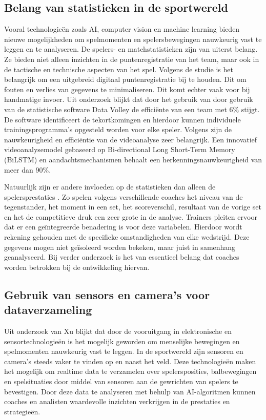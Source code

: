 \subsection{Belang van statistieken in de sportwereld}
Vooral technologieën zoals AI, computer vision en machine learning bieden nieuwe mogelijkheden om spelmomenten en spelersbewegingen nauwkeurig vast te leggen en te analyseren. De spelers- en matchstatistieken \autocite{Wahyuti2023} zijn van uiterst belang. Ze bieden niet alleen inzichten in de puntenregistratie van het team, maar ook in de tactische en technische aspecten van het spel. Volgens de studie is het belangrijk om een uitgebreid digitaal puntenregistratie bij te houden. Dit om fouten en verlies van gegevens te minimaliseren. Dit komt echter vaak voor bij handmatige invoer. Uit onderzoek \autocite{Harabagiu2023} blijkt dat door het gebruik van door gebruik van de statistische software Data Volley de efficiënte van een team met 6\% stijgt. De software identificeert de tekortkomingen en hierdoor kunnen individuele trainingsprogramma's opgesteld worden voor elke speler. Volgens \textcite{Ruiye2024} zijn de nauwkeurigheid en efficiëntie van de videoanalyse zeer belangrijk. Een innovatief videoanalysemodel gebaseerd op Bi-directional Long Short-Term Memory (BiLSTM) en aandachtsmechanismen behaalt een herkenningsnauwkeurigheid van meer dan 90\%.

Natuurlijk zijn er andere invloeden op de statistieken dan alleen de spelersprestaties \autocite{LopezSerrano2022}. Zo spelen volgens verschillende coaches het niveau van de tegenstander, het moment in een set, het scoreverschil, resultaat van de vorige set en het de competitieve druk een zeer grote in de analyse. Trainers pleiten ervoor dat er een geïntegreerde benadering is voor deze variabelen. Hierdoor wordt rekening gehouden met de specifieke omstandigheden van elke wedstrijd. Deze gegevens mogen niet geïsoleerd worden bekeken, maar juist in samenhang geanalyseerd. Bij verder onderzoek is het van essentieel belang dat coaches worden betrokken bij de ontwikkeling hiervan.

\subsection{Gebruik van sensors en camera's voor dataverzameling}
Uit onderzoek van Xu \textcite{Sun2021} blijkt dat door de vooruitgang in elektronische en sensortechnologieën is het mogelijk geworden om menselijke bewegingen en spelmomenten nauwkeurig vast te leggen. In de sportwereld zijn sensoren en camera's steeds vaker te vinden op en naast het veld. Deze technologieën maken het mogelijk om realtime data te verzamelen over spelersposities, balbewegingen en spelsituaties door middel van sensoren aan de gewrichten van spelers te bevestigen. Door deze data te analyseren met behulp van AI-algoritmen kunnen coaches en analisten waardevolle inzichten verkrijgen in de prestaties en strategieën.

